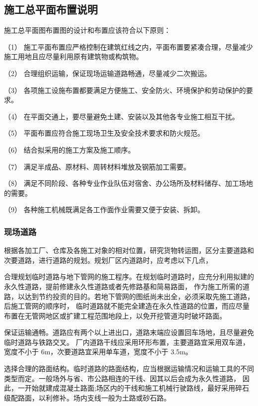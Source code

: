 \subsection{施工总平面布置说明}

施工总平面图布置图的设计和布置应该符合以下原则：

（1） 施工平面布置应严格控制在建筑红线之内，平面布置要紧凑合理，尽量减少施工用地且应尽量利用原有建筑物或构筑物。

（2） 合理组织运输，保证现场运输道路畅通，尽量减少二次搬运。

（3） 各项施工设施布置都要满足方便施工、安全防火、环境保护和劳动保护的要求。

（4） 在平面交通上，要尽量避免土建、安装以及其他各专业施工相互干扰。

（5） 平面布置应符合施工现场卫生及安全技术要求和防火规范。

（6） 结合拟采用的施工方案及施工顺序。

（7） 满足半成品、原材料、周转材料堆放及钢筋加工需要。

（8） 满足不同阶段、各种专业作业队伍对宿舍、办公场所及材料储存、加工场地的需要。

（9） 各种施工机械既满足各工作面作业需要又便于安装、拆卸。

\subsubsection{现场道路}

根据各加工厂、仓库及各施工对象的相对位置，研究货物转运图，区分主要道路和次要道路，进行道路的规划。规划厂区内道路时，应考虑以下几点，

 合理规划临时道路与地下管网的施工程序。在规划临时道路时，应充分利用拟建的永久性道路，提前修建永久性道路或者先修路基和简易路面，
作为施工所需的道路，以达到节约投资的目的。若地下管网的图纸尚未出全，必须采取先施工道路，后施工管网的顺序时，
临时道路就不能完全建造在永久性道路的位置，而应尽量布置在无管网地区或扩建工程范围地段上，以免开挖管道沟时破坏路面。

 保证运输通畅。道路应有两个以上进出口，道路末端应设置回车场地，且尽量避免临时道路与铁路交叉。
厂内道路干线应采用环形布置，主要道路宜采用双车道，宽度不小于 6m，次要道路宜采用单车道，宽度不小于 3.5m。

 选择合理的路面结构。临时道路的路面结构，应当根据运输情况和运输工具的不同类型而定。一般场外与省、市公路相连的干线、因其以后会成为永久性道路，
因此，一开始就建成混凝土路面;场区内的干线和施工机械行驶路线，最好采用碎石级配路面，以利修补。场内支线一般为土路或砂石路。

